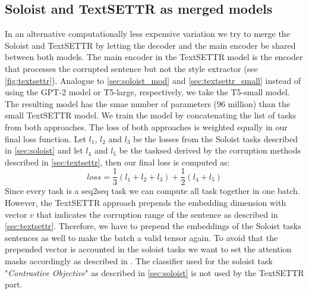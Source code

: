 \documentclass[twocolumn]{tum-article}
\begin{document}
\subsection{Soloist and TextSETTR as merged models}
In an alternative computationally less expensive variation we try to merge the Soloist and TextSETTR by letting the decoder and the main encoder be shared between both models. The main encoder in the TextSETTR model is the encoder that processes the corrupted sentence but not the style extractor (see \autoref{fig:textsettr}). Analogue to \autoref{sec:soloist_mod} and \autoref{sec:textsettr_small} instead of using the GPT-2 model or T5-large, respectively, we take the T5-small model. The resulting model has the smae number of parameters ($96$ million) than the small TextSETTR model. We train the model by concatenating the list of tasks from both approaches. The loss of both approaches is weighted equally in our final loss function. Let $l_1$, $l_2$ and $l_3$ be the losses from the Soloist tasks described in \autoref{sec:soloist} and let $l_4$ and $l_5$ be the tasksed derived by the corruption methods described in \autoref{sec:textsettr}, then our final loss is computed as:
$$
loss = \frac{1}{3}(l_1 + l_2 + l_3) + \frac{1}{2} (l_4 + l_5)
$$
Since every task is a seq2seq task we can compute all task together in one batch. However, the TextSETTR approach prepends the embedding dimension with vector $v$ that indicates the corruption range of the sentence as described in \autoref{sec:textsettr}. Therefore, we have to prepend the embeddings of the Soloist tasks sentences as well to make the batch a valid tensor again. To avoid that the prepended vector is accounted in the soloist tasks we want to set the attention masks accordingly as described in \cite{vaswani2017attention}. The classifier used for the soloist task "\textit{Contrastive Objective}" as described in \autoref{sec:soloist} is not used by the TextSETTR part.
\end{document}
